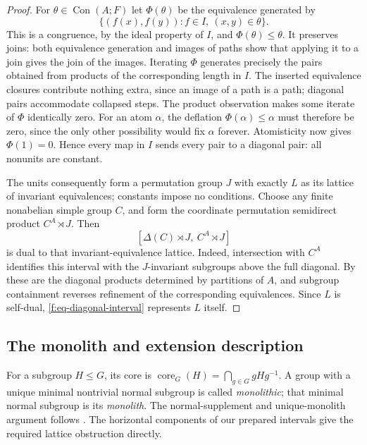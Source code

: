 \begin{proof}
For $\theta\in\operatorname{Con}(A;F)$ let $\Phi(\theta)$ be the equivalence
generated by
\[
 \{(f(x),f(y)):f\in I,\ (x,y)\in\theta\}.
\]
This is a congruence, by the ideal property of $I$, and
$\Phi(\theta)\le\theta$. It preserves joins: both equivalence generation and
images of paths show that applying it to a join gives the join of the
images. Iterating $\Phi$ generates precisely the pairs obtained from
products of the corresponding length in $I$. The inserted equivalence
closures contribute nothing extra, since an image of a path is a path;
diagonal pairs accommodate collapsed steps. The product observation makes
some iterate of $\Phi$ identically zero. For an atom $\alpha$, the deflation
$\Phi(\alpha)\le\alpha$ must therefore be zero, since the only other
possibility would fix $\alpha$ forever. Atomisticity now gives
$\Phi(1)=0$. Hence every map in $I$ sends every pair to a diagonal pair:
all nonunits are constant.

The units consequently form a permutation group $J$ with exactly $L$ as
its lattice of invariant equivalences; constants impose no conditions.
Choose any finite nonabelian simple group $C$, and form the coordinate
permutation semidirect product $C^A\rtimes J$. Then
\begin{equation}\label{f:eq-diagonal-interval}
 [\Delta(C)\rtimes J,\ C^A\rtimes J]
\end{equation}
is dual to that invariant-equivalence lattice. Indeed, intersection with
$C^A$ identifies this interval with the $J$-invariant subgroups above the
full diagonal. By  these are the diagonal products
determined by partitions of $A$, and subgroup containment reverses
refinement of the corresponding equivalences. Since $L$ is self-dual,
\eqref{f:eq-diagonal-interval} represents $L$ itself.
\end{proof}

\subsection{The monolith and extension description}

For a subgroup $H\le G$, its core is
$\operatorname{core}_G(H)=\bigcap_{g\in G}gHg^{-1}$. A group with a unique
minimal nontrivial normal subgroup is called \emph{monolithic}; that
minimal normal subgroup is its \emph{monolith}.
The normal-supplement and unique-monolith argument follows
\citet[Lemma~3.6]{PalfyTwisted}. The horizontal components of our prepared
intervals give the required lattice obstruction directly.

